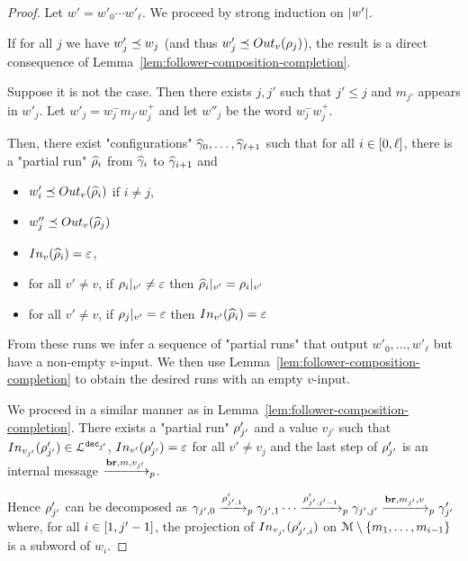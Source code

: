 \begin{proof}
	Let $w' = w'_0 \cdots w'_\ell$.
	We proceed by strong induction on $\size{w'}$.
	
	If for all $j$ we have $w'_j \subword w_j$  (and thus $w'_j \subword \voutput{v}{\run_j}$), the result is a direct consequence of Lemma~\ref{lem:follower-composition-completion}.
	
	Suppose it is not the case. Then there exists $j, j'$ such that $j' \leq j$ and $m_{j'}$ appears in $w'_j$. Let $w'_j = w^-_j m_{j'} w^+_j$ and let $w''_j$ be the word $w^-_jw^+_j$.
	
	Then, there exist "configurations" $\widehat{\config}_0, \ldots, \widehat{\config}_{\ell+1}$ such that for all $i \in\nset{0}{\ell}$, there is a "partial run" $\widehat{\run}_i$ from $\widehat{\config}_i$ to $\widehat{\config}_{i+1}$ and
\begin{itemize}
	\item $w'_i \subword \voutput{v}{\widehat{\run}_i}$ if $i \neq j$,
	
	\item $w''_j \subword \voutput{v}{\widehat{\run}_j}$ 
	
	\item $\vinput{v}{\widehat{\run}_i} = \varepsilon$,
	
	\item for all $v' \neq v$, if $\vproj{v'}{\run_i} \neq \varepsilon$ then $\vproj{v'}{\widehat{\run}_i} = \vproj{v'}{\run_i}$
	
	\item for all $v' \neq v$, if $\vproj{v'}{\run_j} = \varepsilon$ then $\vinput{v'}{\widehat{\run}_i} = \varepsilon$
\end{itemize}

From these runs we infer a sequence of "partial runs" that output $w'_0, \ldots, w'_\ell$ but have a non-empty $v$-input. We then use Lemma~\ref{lem:follower-composition-completion} to obtain the desired runs with an empty $v$-input.

We proceed in a similar manner as in Lemma~\ref{lem:follower-composition-completion}.
There exists a "partial run" $\run'_{j'}$ and a value $v_{j'}$ such that $\vinput{v_{j'}}{\run'_{j'}} \in \langdec{\decsymb_{j'}}$,  $\vinput{v'}{\run'_{j'}} = \varepsilon$ for all $v' \neq v_j$  and the last step of $\run'_{j'}$ is an internal message $\intmessage{m}{v_{j'}}$.

Hence $\run'_{j'}$ can be decomposed as $\config_{{j'},0} \pstep{\run_{{j'},1}'} \config_{{j'},1} \cdots \pstep{\run_{{j'},j'-1}'} \config_{{j'},j'} \intmessage{m_{j'}}{v} \config'_{j'}$ where, for all $i \in \nset{1}{j'-1}$, the projection of $\vinput{v_{j'}}{\run_{{j'},i}'}$ on ${\messages\setminus\set{m_1, \ldots, m_{{i}-1}}}$ is a subword of $w_i$.


\end{proof}
